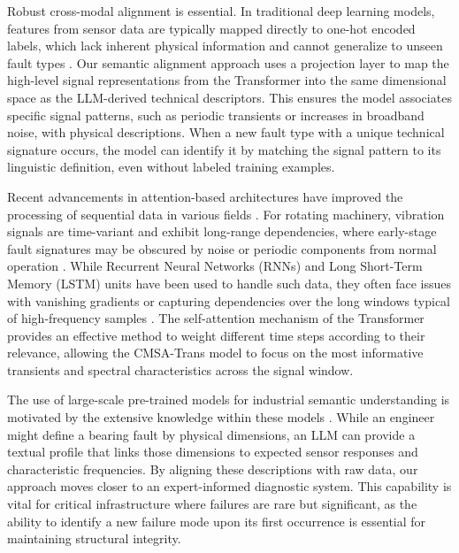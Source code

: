 Robust cross-modal alignment is essential. In traditional deep learning models, features from sensor data are typically mapped directly to one-hot encoded labels, which lack inherent physical information and cannot generalize to unseen fault types \cite{goodfellow2016deep, lecun2015deep}. Our semantic alignment approach uses a projection layer to map the high-level signal representations from the Transformer into the same dimensional space as the LLM-derived technical descriptors. This ensures the model associates specific signal patterns, such as periodic transients or increases in broadband noise, with physical descriptions. When a new fault type with a unique technical signature occurs, the model can identify it by matching the signal pattern to its linguistic definition, even without labeled training examples.

Recent advancements in attention-based architectures have improved the processing of sequential data in various fields \cite{devlin2018bert, dosovitskiy2020image}. For rotating machinery, vibration signals are time-variant and exhibit long-range dependencies, where early-stage fault signatures may be obscured by noise or periodic components from normal operation \cite{zhang2021attention}. While Recurrent Neural Networks (RNNs) and Long Short-Term Memory (LSTM) units have been used to handle such data, they often face issues with vanishing gradients or capturing dependencies over the long windows typical of high-frequency samples \cite{hochreiter1997long}. The self-attention mechanism of the Transformer provides an effective method to weight different time steps according to their relevance, allowing the CMSA-Trans model to focus on the most informative transients and spectral characteristics across the signal window.

The use of large-scale pre-trained models for industrial semantic understanding is motivated by the extensive knowledge within these models \cite{zhao2023brain}. While an engineer might define a bearing fault by physical dimensions, an LLM can provide a textual profile that links those dimensions to expected sensor responses and characteristic frequencies. By aligning these descriptions with raw data, our approach moves closer to an expert-informed diagnostic system. This capability is vital for critical infrastructure where failures are rare but significant, as the ability to identify a new failure mode upon its first occurrence is essential for maintaining structural integrity.

